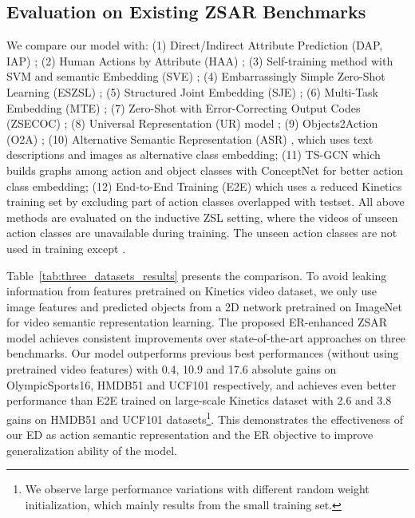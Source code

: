 \subsection{Evaluation on Existing ZSAR Benchmarks}
We compare our model with:
(1) Direct/Indirect Attribute Prediction (DAP, IAP) \cite{lampert2009learning};
(2) Human Actions by Attribute (HAA) \cite{liu2011recognizing};
(3) Self-training method with SVM and semantic Embedding (SVE) \cite{xu2015semantic};
(4) Embarrassingly Simple Zero-Shot Learning (ESZSL) \cite{romera2015embarrassingly};
(5) Structured Joint Embedding (SJE) \cite{akata2015evaluation};
(6) Multi-Task Embedding (MTE) \cite{xu2016multi};
(7) Zero-Shot with Error-Correcting Output Codes (ZSECOC) \cite{qin2017zero};
(8) Universal Representation (UR) model \cite{zhu2018towards};
(9) Objects2Action (O2A) \cite{jain2015objects2action};
(10) Alternative Semantic Representation (ASR) \cite{wang2017alternative}, which uses text descriptions and images as alternative class embedding;
(11) TS-GCN \cite{gao2019know} which builds graphs among action and object classes with ConceptNet for better action class embedding;
(12) End-to-End Training (E2E) \cite{brattoli2020rethinking} which uses a reduced Kinetics training set by excluding part of action classes overlapped with testset.
All above methods are evaluated on the inductive ZSL setting, where the videos of unseen action classes are unavailable during training. The unseen action classes are not used in training except \cite{gao2019know}.

Table~\ref{tab:three_datasets_results} presents the comparison.
To avoid leaking information from features pretrained on Kinetics video dataset, we only use image features and predicted objects from a 2D network pretrained on ImageNet \cite{kolesnikov2019big} for video semantic representation learning.
The proposed ER-enhanced ZSAR model achieves consistent improvements over state-of-the-art approaches on three benchmarks.
Our model outperforms previous best performances (without using pretrained video features) with 0.4, 10.9 and 17.6 absolute gains on OlympicSports16, HMDB51 and UCF101 respectively, and achieves even better performance than E2E trained on large-scale Kinetics dataset with 2.6 and 3.8 gains on HMDB51 and UCF101 datasets\footnote{We observe large performance variations with different random weight initialization, which mainly results from the small training set.}.
This demonstrates the effectiveness of our ED as action semantic representation and the ER objective to improve generalization ability of the model.


